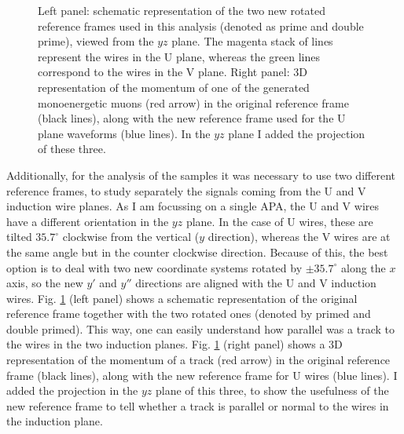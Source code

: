 \begin{figure}[t]
\begin{subfigure}{0.5\textwidth}
	\end{subfigure}
	\caption[Schematic representation of the two rotated reference frames used in the analysis of the MC filter performance.]{Left panel: schematic representation of the two new rotated reference frames used in this analysis (denoted as prime and double prime), viewed from the $yz$ plane. The magenta stack of lines represent the wires in the U plane, whereas the green lines correspond to the wires in the V plane. Right panel: 3D representation of the momentum of one of the generated monoenergetic muons (red arrow) in the original reference frame (black lines), along with the new reference frame used for the U plane waveforms (blue lines). In the $yz$ plane I added the projection of these three.}
	\label{fig:reference_frame}
\end{figure}

Additionally, for the analysis of the samples it was necessary to use two different reference frames, to study separately the signals coming from the U and V induction wire planes. As I am focussing on a single APA, the U and V wires have a different orientation in the $yz$ plane. In the case of U wires, these are tilted $35.7^{\circ}$ clockwise from the vertical ($y$ direction), whereas the V wires are at the same angle but in the counter clockwise direction. Because of this, the best option is to deal with two new coordinate systems rotated by $\pm 35.7^{\circ}$ along the $x$ axis, so the new $y'$ and $y''$ directions are aligned with the U and V induction wires. Fig. \ref{fig:reference_frame} (left panel) shows a schematic representation of the original reference frame together with the two rotated ones (denoted by primed and double primed). This way, one can easily understand how parallel was a track to the wires in the two induction planes. Fig. \ref{fig:reference_frame} (right panel) shows a 3D representation of the momentum of a track (red arrow) in the original reference frame (black lines), along with the new reference frame for U wires (blue lines). I added the projection in the $yz$ plane of this three, to show the usefulness of the new reference frame to tell whether a track is parallel or normal to the wires in the induction plane.

